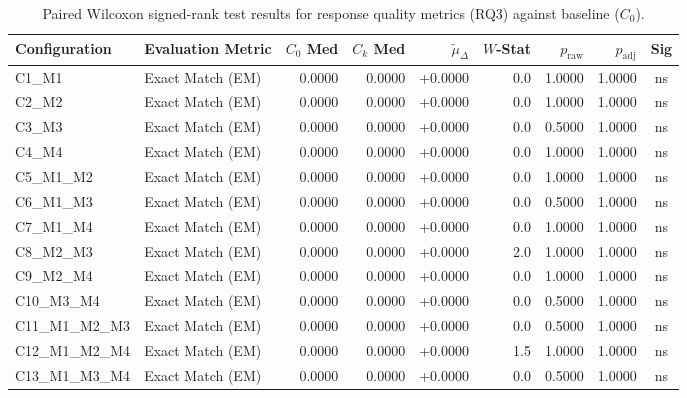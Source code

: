 \begin{table}[p]
\centering
\scriptsize
\setlength{\tabcolsep}{2.4pt}
\renewcommand{\arraystretch}{0.92}
\caption{Paired Wilcoxon signed-rank test results for response quality metrics (RQ3) against baseline ($C_0$).}
\label{tab:wilcoxon_rq3}
\begin{tabular*}{\textwidth}{@{\extracolsep{\fill}} l l r r r r r r c @{}}
\toprule
\textbf{Configuration} & \textbf{Evaluation Metric} & \textbf{$C_0$ Med} & \textbf{$C_k$ Med} & \textbf{$\tilde{\mu}_\Delta$} & \textbf{$W$-Stat} & \textbf{$p_{\text{raw}}$} & \textbf{$p_{\text{adj}}$} & \textbf{Sig} \\
\midrule
C1\_M1          & Exact Match (EM)     & 0.0000 & 0.0000 & +0.0000 & 0.0 & 1.0000 & 1.0000 & ns \\
\addlinespace
C2\_M2          & Exact Match (EM)     & 0.0000 & 0.0000 & +0.0000 & 0.0 & 1.0000 & 1.0000 & ns \\
\addlinespace
C3\_M3          & Exact Match (EM)     & 0.0000 & 0.0000 & +0.0000 & 0.0 & 0.5000 & 1.0000 & ns \\
\addlinespace
C4\_M4          & Exact Match (EM)     & 0.0000 & 0.0000 & +0.0000 & 0.0 & 1.0000 & 1.0000 & ns \\
\addlinespace
C5\_M1\_M2      & Exact Match (EM)     & 0.0000 & 0.0000 & +0.0000 & 0.0 & 1.0000 & 1.0000 & ns \\
\addlinespace
C6\_M1\_M3      & Exact Match (EM)     & 0.0000 & 0.0000 & +0.0000 & 0.0 & 0.5000 & 1.0000 & ns \\
\addlinespace
C7\_M1\_M4      & Exact Match (EM)     & 0.0000 & 0.0000 & +0.0000 & 0.0 & 1.0000 & 1.0000 & ns \\
\addlinespace
C8\_M2\_M3      & Exact Match (EM)     & 0.0000 & 0.0000 & +0.0000 & 2.0 & 1.0000 & 1.0000 & ns \\
\addlinespace
C9\_M2\_M4      & Exact Match (EM)     & 0.0000 & 0.0000 & +0.0000 & 0.0 & 1.0000 & 1.0000 & ns \\
\addlinespace
C10\_M3\_M4     & Exact Match (EM)     & 0.0000 & 0.0000 & +0.0000 & 0.0 & 0.5000 & 1.0000 & ns \\
\addlinespace
C11\_M1\_M2\_M3 & Exact Match (EM)     & 0.0000 & 0.0000 & +0.0000 & 0.0 & 0.5000 & 1.0000 & ns \\
\addlinespace
C12\_M1\_M2\_M4 & Exact Match (EM)     & 0.0000 & 0.0000 & +0.0000 & 1.5 & 1.0000 & 1.0000 & ns \\
\addlinespace
C13\_M1\_M3\_M4 & Exact Match (EM)     & 0.0000 & 0.0000 & +0.0000 & 0.0 & 0.5000 & 1.0000 & ns \\

\end{tabular*}
\end{table}
